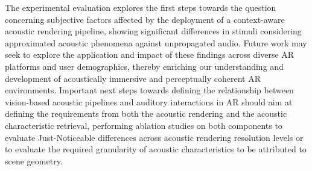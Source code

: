 The experimental evaluation explores the first steps towards the question concerning subjective factors affected by the deployment of a context-aware acoustic rendering pipeline, showing significant differences in stimuli considering approximated acoustic phenomena against unpropagated audio. Future work may seek to explore the application and impact of these findings across diverse AR platforms and user demographics, thereby enriching our understanding and development of acoustically immersive and perceptually coherent AR environments. Important next steps towards defining the relationship between vision-based acoustic pipelines and auditory interactions in AR should aim at defining the requirements from both the acoustic rendering and the acoustic characteristic retrieval, performing ablation studies on both components to evaluate Just-Noticeable differences across acoustic rendering resolution levels or to evaluate the required granularity of acoustic characteristics to be attributed to scene geometry.
